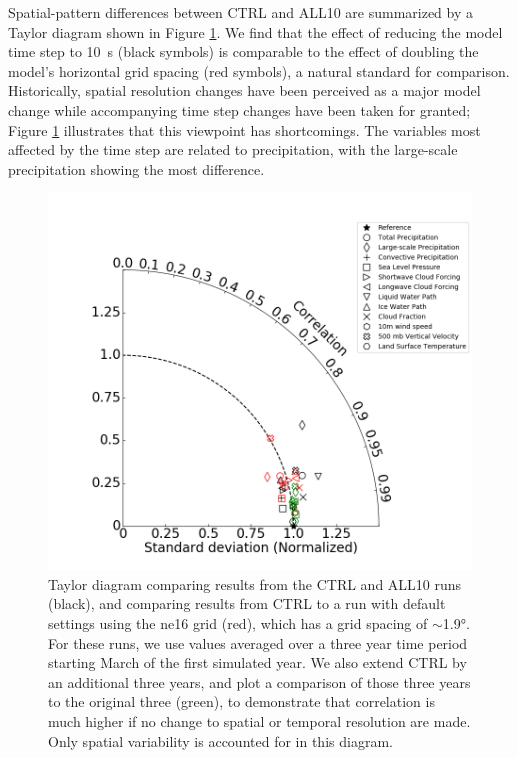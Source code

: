 \documentclass [11pt, proquest] {uwthesis}[2020/02/24]
\begin{document}
Spatial-pattern differences between CTRL and ALL10 are summarized by a Taylor diagram shown in Figure \ref{fig:taylor}. We find that the effect of reducing the model time step to \SI{10}{\second} (black symbols) is comparable to the effect of doubling the model's horizontal grid spacing (red symbols), a natural standard for comparison. Historically, spatial resolution changes have been perceived as a major model change while accompanying time step changes have been taken for granted; Figure \ref{fig:taylor} illustrates that this viewpoint has shortcomings. The variables most affected by the time step are related to precipitation, with the large-scale precipitation showing the most difference.

\begin{figure}
    \centering
    \includegraphics[width=6.5in]{ANN_metrics_taylor_diag_timesteps.png}
    \caption[Taylor diagram comparing EAMv1 simulations at varying spatial and temporal resolution]{Taylor diagram comparing results from the CTRL and ALL10 runs (black), and comparing results from CTRL to a run with default settings using the ne16 grid (red), which has a grid spacing of $\sim$\ang{1.9}. For these runs, we use values averaged over a three year time period starting March of the first simulated year. We also extend CTRL by an additional three years, and plot a comparison of those three years to the original three (green), to demonstrate that correlation is much higher if no change to spatial or temporal resolution are made. Only spatial variability is accounted for in this diagram.}
    \label{fig:taylor}
\end{figure}
\end{document}
